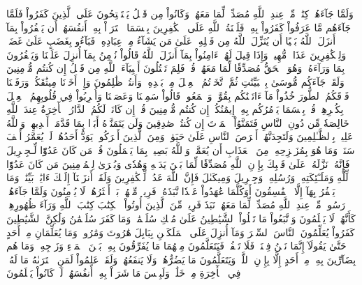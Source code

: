 وَلَمَّا جَآءَهُمۡ كِتَٰبٞ مِّنۡ عِندِ ٱللَّهِ مُصَدِّقٞ لِّمَا مَعَهُمۡ وَكَانُواْ مِن قَبۡلُ يَسۡتَفۡتِحُونَ عَلَى ٱلَّذِينَ كَفَرُواْ فَلَمَّا جَآءَهُم مَّا عَرَفُواْ كَفَرُواْ بِهِۦۚ فَلَعۡنَةُ ٱللَّهِ عَلَى ٱلۡكَٰفِرِينَ
بِئۡسَمَا ٱشۡتَرَوۡاْ بِهِۦٓ أَنفُسَهُمۡ أَن يَكۡفُرُواْ بِمَآ أَنزَلَ ٱللَّهُ بَغۡيًا أَن يُنَزِّلَ ٱللَّهُ مِن فَضۡلِهِۦ عَلَىٰ مَن يَشَآءُ مِنۡ عِبَادِهِۦۖ فَبَآءُو بِغَضَبٍ عَلَىٰ غَضَبٖۚ وَلِلۡكَٰفِرِينَ عَذَابٞ مُّهِينٞ
وَإِذَا قِيلَ لَهُمۡ ءَامِنُواْ بِمَآ أَنزَلَ ٱللَّهُ قَالُواْ نُؤۡمِنُ بِمَآ أُنزِلَ عَلَيۡنَا وَيَكۡفُرُونَ بِمَا وَرَآءَهُۥ وَهُوَ ٱلۡحَقُّ مُصَدِّقٗا لِّمَا مَعَهُمۡۗ قُلۡ فَلِمَ تَقۡتُلُونَ أَنۢبِيَآءَ ٱللَّهِ مِن قَبۡلُ إِن كُنتُم مُّؤۡمِنِينَ
۞وَلَقَدۡ جَآءَكُم مُّوسَىٰ بِٱلۡبَيِّنَٰتِ ثُمَّ ٱتَّخَذۡتُمُ ٱلۡعِجۡلَ مِنۢ بَعۡدِهِۦ وَأَنتُمۡ ظَٰلِمُونَ
وَإِذۡ أَخَذۡنَا مِيثَٰقَكُمۡ وَرَفَعۡنَا فَوۡقَكُمُ ٱلطُّورَ خُذُواْ مَآ ءَاتَيۡنَٰكُم بِقُوَّةٖ وَٱسۡمَعُواْۖ قَالُواْ سَمِعۡنَا وَعَصَيۡنَا وَأُشۡرِبُواْ فِي قُلُوبِهِمُ ٱلۡعِجۡلَ بِكُفۡرِهِمۡۚ قُلۡ بِئۡسَمَا يَأۡمُرُكُم بِهِۦٓ إِيمَٰنُكُمۡ إِن كُنتُم مُّؤۡمِنِينَ
قُلۡ إِن كَانَتۡ لَكُمُ ٱلدَّارُ ٱلۡأٓخِرَةُ عِندَ ٱللَّهِ خَالِصَةٗ مِّن دُونِ ٱلنَّاسِ فَتَمَنَّوُاْ ٱلۡمَوۡتَ إِن كُنتُمۡ صَٰدِقِينَ
وَلَن يَتَمَنَّوۡهُ أَبَدَۢا بِمَا قَدَّمَتۡ أَيۡدِيهِمۡۚ وَٱللَّهُ عَلِيمُۢ بِٱلظَّـٰلِمِينَ
وَلَتَجِدَنَّهُمۡ أَحۡرَصَ ٱلنَّاسِ عَلَىٰ حَيَوٰةٖ وَمِنَ ٱلَّذِينَ أَشۡرَكُواْۚ يَوَدُّ أَحَدُهُمۡ لَوۡ يُعَمَّرُ أَلۡفَ سَنَةٖ وَمَا هُوَ بِمُزَحۡزِحِهِۦ مِنَ ٱلۡعَذَابِ أَن يُعَمَّرَۗ وَٱللَّهُ بَصِيرُۢ بِمَا يَعۡمَلُونَ
قُلۡ مَن كَانَ عَدُوّٗا لِّـجِبۡرِيلَ فَإِنَّهُۥ نَزَّلَهُۥ عَلَىٰ قَلۡبِكَ بِإِذۡنِ ٱللَّهِ مُصَدِّقٗا لِّمَا بَيۡنَ يَدَيۡهِ وَهُدٗى وَبُشۡرَىٰ لِلۡمُؤۡمِنِينَ
مَن كَانَ عَدُوّٗا لِّلَّهِ وَمَلَـٰٓئِكَتِهِۦ وَرُسُلِهِۦ وَجِبۡرِيلَ وَمِيكَىٰلَ فَإِنَّ ٱللَّهَ عَدُوّٞ لِّلۡكَٰفِرِينَ
وَلَقَدۡ أَنزَلۡنَآ إِلَيۡكَ ءَايَٰتِۭ بَيِّنَٰتٖۖ وَمَا يَكۡفُرُ بِهَآ إِلَّا ٱلۡفَٰسِقُونَ
أَوَكُلَّمَا عَٰهَدُواْ عَهۡدٗا نَّبَذَهُۥ فَرِيقٞ مِّنۡهُمۚ بَلۡ أَكۡثَرُهُمۡ لَا يُؤۡمِنُونَ
وَلَمَّا جَآءَهُمۡ رَسُولٞ مِّنۡ عِندِ ٱللَّهِ مُصَدِّقٞ لِّمَا مَعَهُمۡ نَبَذَ فَرِيقٞ مِّنَ ٱلَّذِينَ أُوتُواْ ٱلۡكِتَٰبَ كِتَٰبَ ٱللَّهِ وَرَآءَ ظُهُورِهِمۡ كَأَنَّهُمۡ لَا يَعۡلَمُونَ
وَٱتَّبَعُواْ مَا تَتۡلُواْ ٱلشَّيَٰطِينُ عَلَىٰ مُلۡكِ سُلَيۡمَٰنَۖ وَمَا كَفَرَ سُلَيۡمَٰنُ وَلَٰكِنَّ ٱلشَّيَٰطِينَ كَفَرُواْ يُعَلِّمُونَ ٱلنَّاسَ ٱلسِّحۡرَ وَمَآ أُنزِلَ عَلَى ٱلۡمَلَكَيۡنِ بِبَابِلَ هَٰرُوتَ وَمَٰرُوتَۚ وَمَا يُعَلِّمَانِ مِنۡ أَحَدٍ حَتَّىٰ يَقُولَآ إِنَّمَا نَحۡنُ فِتۡنَةٞ فَلَا تَكۡفُرۡۖ فَيَتَعَلَّمُونَ مِنۡهُمَا مَا يُفَرِّقُونَ بِهِۦ بَيۡنَ ٱلۡمَرۡءِ وَزَوۡجِهِۦۚ وَمَا هُم بِضَآرِّينَ بِهِۦ مِنۡ أَحَدٍ إِلَّا بِإِذۡنِ ٱللَّهِۚ وَيَتَعَلَّمُونَ مَا يَضُرُّهُمۡ وَلَا يَنفَعُهُمۡۚ وَلَقَدۡ عَلِمُواْ لَمَنِ ٱشۡتَرَىٰهُ مَا لَهُۥ فِي ٱلۡأٓخِرَةِ مِنۡ خَلَٰقٖۚ وَلَبِئۡسَ مَا شَرَوۡاْ بِهِۦٓ أَنفُسَهُمۡۚ لَوۡ كَانُواْ يَعۡلَمُونَ
